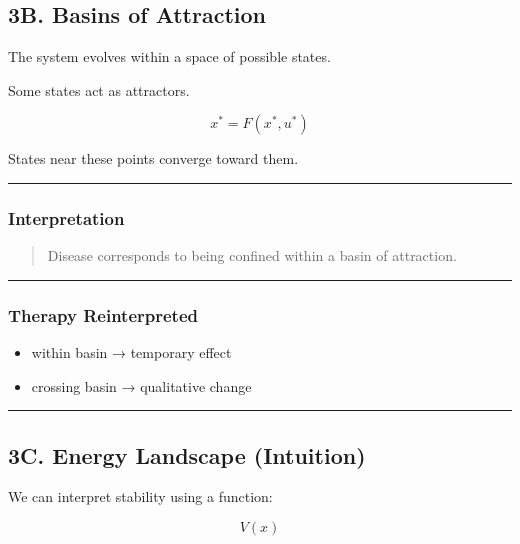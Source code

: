 \documentclass[
  letterpaper,
  DIV=11,
  numbers=noendperiod]{scrartcl}
\providecommand{\tightlist}{%
  \setlength{\itemsep}{0pt}\setlength{\parskip}{0pt}}
\begin{document}
\subsection{3B. Basins of Attraction}\label{b.-basins-of-attraction}

The system evolves within a space of possible states.

Some states act as attractors.

\[
x^* = F(x^*, u^*)
\]

States near these points converge toward them.

\begin{center}\rule{0.5\linewidth}{0.5pt}\end{center}

\subsubsection{Interpretation}\label{interpretation}

\begin{quote}
Disease corresponds to being confined within a basin of attraction.
\end{quote}

\begin{center}\rule{0.5\linewidth}{0.5pt}\end{center}

\subsubsection{Therapy Reinterpreted}\label{therapy-reinterpreted}

\begin{itemize}
\tightlist
\item
  within basin → temporary effect\\
\item
  crossing basin → qualitative change
\end{itemize}

\begin{center}\rule{0.5\linewidth}{0.5pt}\end{center}

\subsection{3C. Energy Landscape
(Intuition)}\label{c.-energy-landscape-intuition}

We can interpret stability using a function:

\[
V(x)
\]
\end{document}
